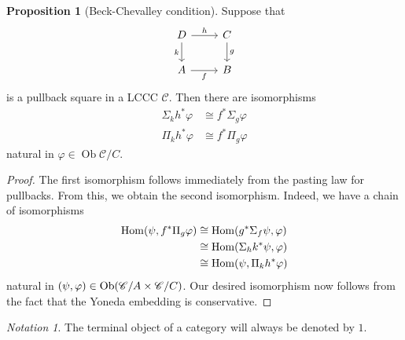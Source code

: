 \documentclass[10pt,letterpaper,cm]{nupset}
\theoremstyle{definition}
\theoremstyle{theorem}
\newtheorem{prop}[definition]{Proposition}
\theoremstyle{remark}
\newtheorem*{notation}{Notation}
\DeclareMathOperator{\ob}{Ob}
\newcommand{\0}{\mathbf{0}}
\newcommand{\1}{\mathbf{1}}
\newcommand{\2}{\mathbf{2}}
\renewcommand{\c}{\mathscr{C}}
\DeclareMathOperator{\Hom}{Hom}
\begin{document}
\smallskip

\begin{prop}[Beck-Chevalley condition]\label{C-B} Suppose that
\[
\begin{tikzcd}
D \arrow[d, "k"'] \arrow[r, "h"] & C \arrow[d, "g"] \\
A \arrow[r, "f"']                & B               
\end{tikzcd}
\] is a pullback square in a LCCC $\c$. Then there are isomorphisms 
\begin{align*}
\Sigma_k{h^{\ast}{\varphi}} &  \cong f^{\ast}{\Sigma_g{\varphi}}
\\  \Pi_k{{h^{\ast}{\varphi}}} & \cong f^{\ast}{\Pi_g{\varphi}}     
\end{align*}
 natural in $\varphi \in \ob{\c/C}$.
\end{prop}
\begin{proof} 
The first isomorphism follows immediately from the pasting law for pullbacks. From this, we obtain the second isomorphism. Indeed, we have a chain of isomorphisms
\begin{align*}
\Hom\mleft(\psi, f^{\ast}{\Pi_g{\varphi}}\mright) & \cong \Hom\mleft(g^{\ast}{\Sigma_f{\psi}}, \varphi\mright) 
\\ & \cong \Hom\mleft(\Sigma_h{k^{\ast}{\psi}}, \varphi\mright) 
\\ & \cong \Hom\mleft(\psi , \Pi_k{h^{\ast}{\varphi}}  \mright) 
\end{align*}
natural  in $\mleft(\psi, \varphi\mright) \in \ob\mleft(\c/A \times \c/C\mright)$. Our desired isomorphism now follows from the fact that  the Yoneda embedding is conservative.
\end{proof}

\medskip

\begin{notation}
The terminal object of a category will always be denoted by $1$.
\end{notation}
\end{document}
